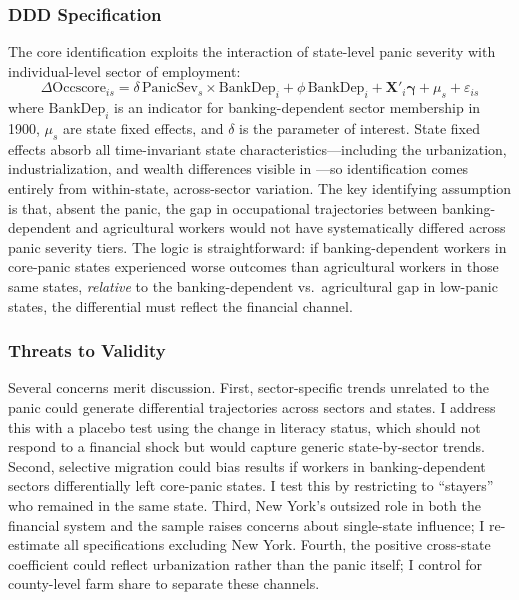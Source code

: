 \documentclass[12pt]{article}
\begin{document}
\subsubsection*{DDD Specification} The core identification exploits the interaction of state-level panic severity with individual-level sector of employment:
\begin{equation}
\Delta \text{Occscore}_{is} = \delta \, \text{PanicSev}_s \times \text{BankDep}_i + \phi \, \text{BankDep}_i + \mathbf{X}'_i \boldsymbol{\gamma} + \mu_s + \varepsilon_{is}
\label{eq:ddd}
\end{equation}
where $\text{BankDep}_i$ is an indicator for banking-dependent sector membership in 1900, $\mu_s$ are state fixed effects, and $\delta$ is the parameter of interest. State fixed effects absorb all time-invariant state characteristics---including the urbanization, industrialization, and wealth differences visible in ---so identification comes entirely from within-state, across-sector variation. The key identifying assumption is that, absent the panic, the gap in occupational trajectories between banking-dependent and agricultural workers would not have systematically differed across panic severity tiers. The logic is straightforward: if banking-dependent workers in core-panic states experienced worse outcomes than agricultural workers in those same states, \textit{relative} to the banking-dependent vs.\ agricultural gap in low-panic states, the differential must reflect the financial channel.

\subsubsection*{Threats to Validity} Several concerns merit discussion. First, sector-specific trends unrelated to the panic could generate differential trajectories across sectors and states. I address this with a placebo test using the change in literacy status, which should not respond to a financial shock but would capture generic state-by-sector trends. Second, selective migration could bias results if workers in banking-dependent sectors differentially left core-panic states. I test this by restricting to ``stayers'' who remained in the same state. Third, New York's outsized role in both the financial system and the sample raises concerns about single-state influence; I re-estimate all specifications excluding New York. Fourth, the positive cross-state coefficient could reflect urbanization rather than the panic itself; I control for county-level farm share to separate these channels.
\end{document}
